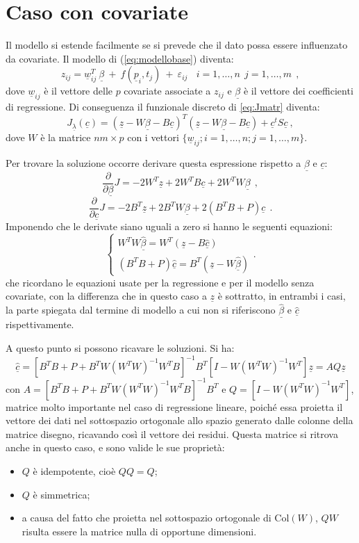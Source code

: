 \documentclass[a4paper,11pt,twoside,openright]{book}							%
\begin{document}
\section{Caso con covariate}

Il modello si estende facilmente se si prevede che il dato possa essere influenzato da covariate. Il modello di (\ref{eq:modellobase}) diventa:
\begin{equation}
\label{eq:modellobasecovar}
z_{ij}= \underline w_{ij}^T\  \underline \beta   \ + \  f(\underline p_i,t_j)\ +\ \varepsilon_{ij}\ \ \ \ i = 1,\ldots,n\ \ j=1,\ldots,m \ \ ,
\end{equation}
dove $\underline w_{ij}$ è il vettore delle $p$ covariate associate a $z_{ij}$ e $\underline \beta$ è il vettore dei coefficienti di regressione. Di conseguenza il funzionale discreto di \ref{eq:Jmatr} diventa:
$$ J_{\underline \lambda }(\underline c) = (\underline z - W \underline \beta - B \underline c)^T (\underline z - W \underline \beta - B \underline c) + \underline c^t S \underline c  \ ,$$
dove $W$ è la matrice $nm \times p$ con i vettori $ \{\underline w_{ij}; i=1,\ldots,n;j=1,\ldots,m\}$.

Per trovare la soluzione occorre derivare questa espressione rispetto a $\underline \beta$ e $\underline c$:
$$
\frac{\partial}{\partial \underline \beta}J= -2W^T \underline z + 2W^T B \underline c + 2 W^TW \underline \beta \ \ ,
$$
$$
\frac{\partial}{\partial \underline c}J= -2 B^T \underline z + 2 B^T W \underline \beta + 2(B^T B + P) \underline c \ \ .
$$
Imponendo che le derivate siano uguali a zero si hanno le seguenti equazioni:
$$
\begin{cases}
W^TW \hat{\underline \beta} = W^T(\underline z - B \hat{\underline c})  \\
(B^T B + P) \hat{\underline c}=B^T(\underline z -W \hat{\underline \beta})
\end{cases}.
$$
che ricordano le equazioni usate per la regressione e per il modello senza covariate, con la differenza che in questo caso a $\underline z$ è sottratto, in entrambi i casi, la parte spiegata dal termine di modello a cui non si riferiscono $\hat{\underline \beta}$ e $\hat{\underline c}$ rispettivamente.

A questo punto si possono ricavare le soluzioni. Si ha:
$$
\hat  {\underline c}=[B^TB+P+B^TW(W^TW)^{-1}W^TB]^{-1}B^T[I-W(W^TW)^{-1}W^T]\underline z=AQ \underline z
$$
con $A=[B^TB+P+B^TW(W^TW)^{-1}W^TB]^{-1}B^T$ e $Q=[I-W(W^TW)^{-1}W^T]$, matrice molto importante nel caso di regressione lineare, poiché essa proietta il vettore dei dati nel sottospazio ortogonale allo spazio generato dalle colonne della matrice disegno, ricavando così il vettore dei residui. Questa matrice si ritrova anche in questo caso, e sono valide le sue proprietà:
\begin{itemize}
\item $Q$ è idempotente, cioè $QQ=Q$;
\item $Q$ è simmetrica;
\item a causa del fatto che proietta nel sottospazio ortogonale di $\mathrm{Col}(W)$, $QW$ risulta essere la matrice nulla di opportune dimensioni. 
\end{itemize}
\end{document}
